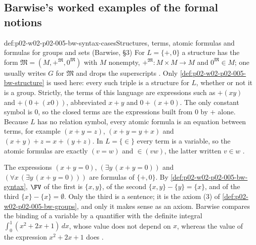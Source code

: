 \subsection{Barwise's worked examples of the formal notions}
\label{sec:p02-w02-p02-005-bw-syntax-examples}

\begin{hbexample}{def:p02-w02-p02-005-bw-syntax-cases}{Structures, terms, atomic formulas and formulas for groups and sets (Barwise, \S3)}
For \(L=\{+,0\}\) a structure has the form
\(\mathfrak M=(M,+^{\mathfrak M},0^{\mathfrak M})\) with \(M\) nonempty,
\(+^{\mathfrak M}:M\times M\to M\) and \(0^{\mathfrak M}\in M\); one usually
writes \(G\) for \(\mathfrak M\) and drops the superscripts
\cite[ch.~A.1, \S3, p.~18]{Barwise1977FirstOrder}.  Only
\cref{def:p02-w02-p02-005-bw-structure} is used here: every such triple is
a structure for \(L\), whether or not it is a group.  Strictly, the terms
of this language are expressions such as \(+(xy)\) and \(+(0+(x0))\),
abbreviated \(x+y\) and \(0+(x+0)\).  The only constant symbol is \(0\),
so the closed terms are the expressions built from \(0\) by \(+\) alone.
Because \(L\) has no relation symbol, every atomic formula is an equation
between terms, for example \((x+y=z)\), \((x+y=y+x)\) and
\((x+y)+z=x+(y+z)\).  In \(L=\{\in\}\) every term is a variable, so the
atomic formulas are exactly \((v=w)\) and \(\in(vw)\), the latter written
\(v\in w\) \cite[ch.~A.1, \S3, pp.~18--19]{Barwise1977FirstOrder}.

The expressions \((x+y=0)\), \((\exists y\,(x+y=0))\) and
\((\forall x\,(\exists y\,(x+y=0)))\) are formulas of \(\{+,0\}\).  By
\cref{def:p02-w02-p02-005-bw-syntax}, \(\FV\) of the first is
\(\{x,y\}\), of the second \(\{x,y\}-\{y\}=\{x\}\), and of the third
\(\{x\}-\{x\}=\emptyset\).  Only the third is a sentence; it is the axiom
(3) of \cref{def:p02-w02-p02-005-bw-groups}, and only it makes sense as an
axiom.  Barwise compares the binding of a variable by a quantifier with
the definite integral \(\int_0^1(x^2+2x+1)\,dx\), whose value does not
depend on \(x\), whereas the value of the expression \(x^2+2x+1\) does
\cite[ch.~A.1, \S3, pp.~19--20]{Barwise1977FirstOrder}.
\end{hbexample}

